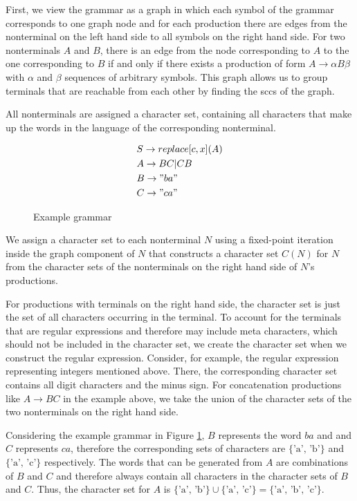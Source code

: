 First, we view the grammar as a graph in which each symbol of the grammar corresponds to one graph node and for each production there are edges from the nonterminal on the left hand side to all symbols on the right hand side. 
For two nonterminals $A$ and $B$, there is an edge from the node corresponding to $A$ to the one corresponding to $B$ if and only if there exists a production of form $A \rightarrow \alpha B \beta$ with $\alpha$ and $\beta$ sequences of arbitrary symbols.
This graph allows us to group terminals that are reachable from each other by finding the \acp{scc} of the graph.

All nonterminals are assigned a character set, containing all characters that make up the words in the language of the corresponding nonterminal.

\begin{figure}[!h]
	\begin{align*}
		&S \rightarrow replace[c, x](A)\\
		&A \rightarrow BC | CB\\
		&B \rightarrow "ba"\\
		&C \rightarrow "ca"
	\end{align*}
	\caption{Example grammar}
	\label{fig:charset:grammar}
\end{figure}

We assign a character set to each nonterminal $N$ using a fixed-point iteration inside the graph component of $N$ that constructs a character set $C(N)$ for $N$ from the character sets of the nonterminals on the right hand side of $N$'s productions.

For productions with terminals on the right hand side, the character set is just the set of all characters occurring in the terminal. To account for the terminals that are regular expressions and therefore may include meta characters, which should not be included in the character set, we create the character set when we construct the regular expression. Consider, for example, the regular expression representing integers mentioned above. There, the corresponding character set contains all digit characters and the minus sign.
For concatenation productions like $A \rightarrow BC$ in the example above, we take the union of the character sets of the two nonterminals on the right hand side.

Considering the example grammar in Figure \ref{fig:charset:grammar}, $B$ represents the word $ba$ and and $C$ represents $ca$, therefore the corresponding sets of characters are  $\{\text{'a', 'b'}\}$ and  $\{\text{'a', 'c'}\}$ respectively. The words that can be generated from $A$ are combinations of $B$ and $C$ and therefore always contain all characters in the character sets of $B$ and $C$. Thus, the character set for $A$ is $\{\text{'a', 'b'}\} \cup \{\text{'a', 'c'}\} = \{\text{'a', 'b', 'c'}\}$.

